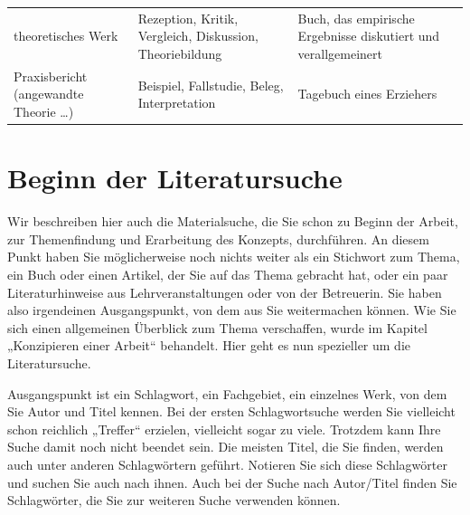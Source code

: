 \documentclass[]{book}
\theoremstyle{definition}
\theoremstyle{definition}
\theoremstyle{definition}
\theoremstyle{remark}
\begin{document}
\begin{longtable}[]{@{}lll@{}}
\begin{minipage}[t]{0.31\columnwidth}
theoretisches Werk\vspace{5mm}\strut
\end{minipage} & \begin{minipage}[t]{0.27\columnwidth}\raggedright\strut
Rezeption, Kritik, Vergleich, Diskussion,
Theoriebildung\vspace{5mm}\strut
\end{minipage} & \begin{minipage}[t]{0.33\columnwidth}\raggedright\strut
Buch, das empirische Ergebnisse diskutiert und verallgemeinert
\vspace{5mm}\strut
\end{minipage}\tabularnewline
\begin{minipage}[t]{0.31\columnwidth}\raggedright\strut
Praxisbericht (angewandte Theorie \ldots{}) \vspace{5mm}\strut
\end{minipage} & \begin{minipage}[t]{0.27\columnwidth}\raggedright\strut
Beispiel, Fallstudie, Beleg, Interpretation \vspace{5mm}\strut
\end{minipage} & \begin{minipage}[t]{0.33\columnwidth}\raggedright\strut
Tagebuch eines Erziehers \vspace{5mm}\strut
\end{minipage}\tabularnewline
\bottomrule
\end{longtable}

\section{Beginn der Literatursuche}\label{beginn-der-literatursuche}

Wir beschreiben hier auch die Materialsuche, die Sie schon zu Beginn der
Arbeit, zur Themenfindung und Erarbeitung des Konzepts, durchführen. An
diesem Punkt haben Sie möglicherweise noch nichts weiter als ein
Stichwort zum Thema, ein Buch oder einen Artikel, der Sie auf das Thema
gebracht hat, oder ein paar Literaturhinweise aus Lehrveranstaltungen
oder von der Betreuerin. Sie haben also irgendeinen Ausgangspunkt, von
dem aus Sie weitermachen können. Wie Sie sich einen allgemeinen
Überblick zum Thema verschaffen, wurde im Kapitel „Konzipieren einer
Arbeit`` behandelt. Hier geht es nun spezieller um die Literatursuche.

Ausgangspunkt ist ein Schlagwort, ein Fachgebiet, ein einzelnes Werk,
von dem Sie Autor und Titel kennen. Bei der ersten Schlagwortsuche
werden Sie vielleicht schon reichlich „Treffer`` erzielen, vielleicht
sogar zu viele. Trotzdem kann Ihre Suche damit noch nicht beendet sein.
Die meisten Titel, die Sie finden, werden auch unter anderen
Schlagwörtern geführt. Notieren Sie sich diese Schlagwörter und suchen
Sie auch nach ihnen. Auch bei der Suche nach Autor/Titel finden Sie
Schlagwörter, die Sie zur weiteren Suche verwenden können.
\end{document}
